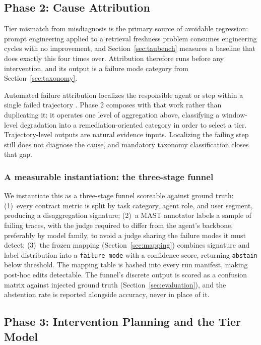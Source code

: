\documentclass[conference]{IEEEtran}
\newcommand{\code}[1]{\texttt{\small #1}}
\begin{document}
\subsection{Phase 2: Cause Attribution}
\label{sec:attribution}

Tier mismatch from misdiagnosis is the primary source of avoidable regression:
prompt engineering applied to a retrieval freshness problem consumes
engineering cycles with no improvement, and Section~\ref{sec:taubench} measures
a baseline that does exactly this four times over. Attribution therefore runs
before any intervention, and its output is a failure mode category from
Section~\ref{sec:taxonomy}.

Automated failure attribution localizes the responsible agent or step within a
single failed trajectory \cite{zhu2026, ma2025attribution, zhang2025,
agenttrace2026}. Phase 2 composes with that work rather than duplicating it: it
operates one level of aggregation above, classifying a window-level degradation
into a remediation-oriented category in order to select a tier.
Trajectory-level outputs are natural evidence inputs. Localizing the failing
step still does not diagnose the cause, and mandatory taxonomy classification
closes that gap.

\subsubsection{A measurable instantiation: the three-stage funnel}
\label{sec:funnel}
We instantiate this as a three-stage funnel scoreable against ground truth:
(1)~every contract metric is split by task category, agent role, and user
segment, producing a disaggregation signature; (2)~a MAST annotator
\cite{cemri2025} labels a sample of failing traces, with the judge required to
differ from the agent's backbone, preferably by model family, to avoid a judge
sharing the failure modes it must detect; (3)~the frozen mapping
(Section~\ref{sec:mapping}) combines signature and label distribution into a
\code{failure\_mode} with a confidence score, returning \code{abstain} below
threshold. The mapping table is hashed into every run manifest, making post-hoc
edits detectable. The funnel's discrete output is scored as a confusion matrix
against injected ground truth (Section~\ref{sec:evaluation}), and the
abstention rate is reported alongside accuracy, never in place of it.

\subsection{Phase 3: Intervention Planning and the Tier Model}
\end{document}
